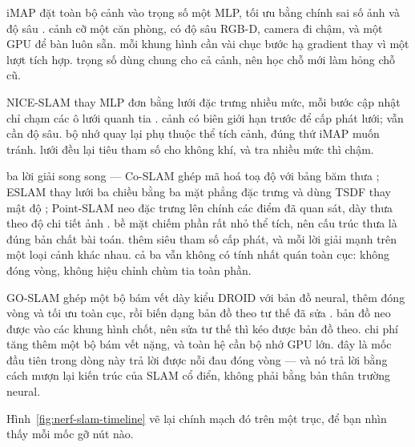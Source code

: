 \documentclass[../../deep_learning.tex]{subfiles}
\begin{document}
\begin{mach}
\item {}
\gp iMAP đặt toàn bộ cảnh vào trọng số một MLP, tối ưu bằng chính sai số ảnh và độ sâu \cite{f32imap2021}.
\gd cảnh cỡ một căn phòng, có độ sâu RGB-D, camera đi chậm, và một GPU để bàn luôn sẵn.
\gia mỗi khung hình cần vài chục bước hạ gradient thay vì một lượt tích hợp.
\vdm trọng số dùng chung cho cả cảnh, nên học chỗ mới làm hỏng chỗ cũ.

\item {}
\gp NICE-SLAM thay MLP đơn bằng lưới đặc trưng nhiều mức, mỗi bước cập nhật chỉ chạm các ô lưới quanh tia \cite{f32niceslam2022}.
\gd cảnh có biên giới hạn trước để cấp phát lưới; vẫn cần độ sâu.
\gia bộ nhớ quay lại phụ thuộc thể tích cảnh, đúng thứ iMAP muốn tránh.
\vdm lưới đều lại tiêu tham số cho không khí, và tra nhiều mức thì chậm.

\item {}
\gp ba lời giải song song --- Co-SLAM ghép mã hoá toạ độ với bảng băm thưa \cite{f32coslam2023}; ESLAM thay lưới ba chiều bằng ba mặt phẳng đặc trưng và dùng TSDF thay mật độ \cite{f32eslam2023}; Point-SLAM neo đặc trưng lên chính các điểm đã quan sát, dày thưa theo độ chi tiết ảnh \cite{f32pointslam2023}.
\gd bề mặt chiếm phần rất nhỏ thể tích, nên cấu trúc thưa là đúng bản chất bài toán.
\gia thêm siêu tham số cấp phát, và mỗi lời giải mạnh trên một loại cảnh khác nhau.
\vdm cả ba vẫn không có tính nhất quán toàn cục: không đóng vòng, không hiệu chỉnh chùm tia toàn phần.

\item {}
\gp GO-SLAM ghép một bộ bám vết dày kiểu DROID với bản đồ neural, thêm đóng vòng và tối ưu toàn cục, rồi biến dạng bản đồ theo tư thế đã sửa \cite{f32goslam2023}.
\gd bản đồ neo được vào các khung hình chốt, nên sửa tư thế thì kéo được bản đồ theo.
\gia chi phí tăng thêm một bộ bám vết nặng, và toàn hệ cần bộ nhớ GPU lớn.
\hq đây là mốc đầu tiên trong dòng này trả lời được nỗi đau đóng vòng --- và nó trả lời bằng cách mượn lại kiến trúc của SLAM cổ điển, không phải bằng bản thân trường neural.
\end{mach}

Hình~\ref{fig:nerf-slam-timeline} vẽ lại chính mạch đó trên một trục, để bạn nhìn thấy mỗi mốc gỡ nút nào.
\end{document}
